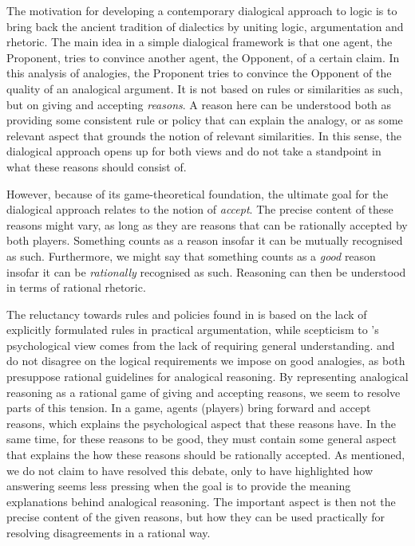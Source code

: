 				The motivation for developing a contemporary dialogical approach to logic is to bring back the ancient tradition of dialectics by uniting logic, argumentation and rhetoric. The main idea in a simple dialogical framework is that one agent, the Proponent, tries to convince another agent, the Opponent, of a certain claim. In this analysis of analogies, the Proponent tries to convince the Opponent of the quality of an analogical argument. It is not based on rules or similarities as such, but on giving and accepting \textit{reasons}. A reason here can be understood both as providing some consistent rule or policy that can explain the analogy, or as some relevant aspect that grounds the notion of relevant similarities. In this sense, the dialogical approach opens up for both views and do not take a standpoint in what these reasons should consist of. 
				
				However, because of its game-theoretical foundation, the ultimate goal for the dialogical approach relates to the notion of \textit{accept}. The precise content of these reasons might vary, as long as they are reasons that can be rationally accepted by both players. Something counts as a reason insofar it can be mutually recognised as such. Furthermore, we might say that something counts as a \textit{good} reason insofar it can be \textit{rationally} recognised as such. Reasoning can then be understood in terms of rational rhetoric. 
				
				The reluctancy towards rules and policies found in \textcite{weinreb2005legal} is based on the lack of explicitly formulated rules in practical argumentation, while  scepticism to \citeauthor{weinreb2005legal}'s psychological view comes from the lack of requiring general understanding. \citeauthor{weinreb2005legal} and \citeauthor{posner2006reasoning} do not disagree on the logical requirements we impose on good analogies, as both presuppose rational guidelines for analogical reasoning. By representing analogical reasoning as a rational game of giving and accepting reasons, we seem to resolve parts of this tension. In a game, agents (players) bring forward and accept reasons, which explains the psychological aspect that these reasons have. In the same time, for these reasons to be good, they must contain some general aspect that explains the how these reasons should be rationally accepted. As mentioned, we do not claim to have resolved this debate, only to have highlighted how answering seems less pressing when the goal is to provide the meaning explanations behind analogical reasoning. The important aspect is then not the precise content of the given reasons, but how they can be used practically for resolving disagreements in a rational way.			
			
				
			
			
			
			
			
			
			
			
			
			
			
			
			
			
			
			
			